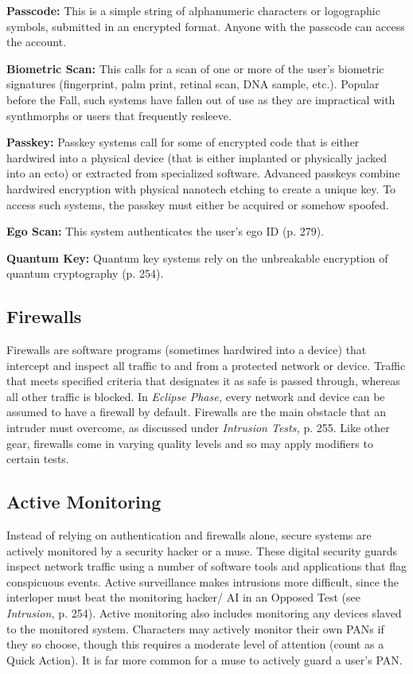 \textbf{Passcode:} This is a simple string of alphanumeric 
characters or logographic symbols, submitted in an 
encrypted format. Anyone with the passcode can 
access the account.

\textbf{Biometric Scan:} This calls for a scan of one or more 
of the user's biometric signatures (fingerprint, palm 
print, retinal scan, DNA sample, etc.). Popular before 
the Fall, such systems have fallen out of use as they 
are impractical with synthmorphs or users that frequently
resleeve.

\textbf{Passkey:} Passkey systems call for some of encrypted 
code that is either hardwired into a physical device 
(that is either implanted or physically jacked into 
an ecto) or extracted from specialized software. Advanced
passkeys combine hardwired encryption with
physical nanotech etching to create a unique key. To 
access such systems, the passkey must either be acquired
or somehow spoofed.

\textbf{Ego Scan:} This system authenticates the user's ego 
ID (p. 279).

\textbf{Quantum Key:} Quantum key systems rely on the unbreakable
encryption of quantum cryptography (p. 254).

\subsection{Firewalls}

Firewalls are software programs (sometimes hardwired
into a device) that intercept and inspect all traffic
to and from a protected network or device. Traffic
that meets specified criteria that designates it as safe 
is passed through, whereas all other traffic is blocked. 
In \textit{Eclipse Phase,} every network and device can be 
assumed to have a firewall by default. Firewalls are 
the main obstacle that an intruder must overcome, as 
discussed under \textit{Intrusion Tests,} p. 255.
Like other gear, firewalls come in varying quality 
levels and so may apply modifiers to certain tests.

\subsection{Active Monitoring}

Instead of relying on authentication and firewalls 
alone, secure systems are actively monitored by a security
hacker or a muse. These digital security guards
inspect network traffic using a number of software 
tools and applications that flag conspicuous events. 
Active surveillance makes intrusions more difficult, 
since the interloper must beat the monitoring hacker/
AI in an Opposed Test (see \textit{Intrusion,} p. 254). Active 
monitoring also includes monitoring any devices 
slaved to the monitored system.
Characters may actively monitor their own PANs if 
they so choose, though this requires a moderate level 
of attention (count as a Quick Action). It is far more 
common for a muse to actively guard a user's PAN.

